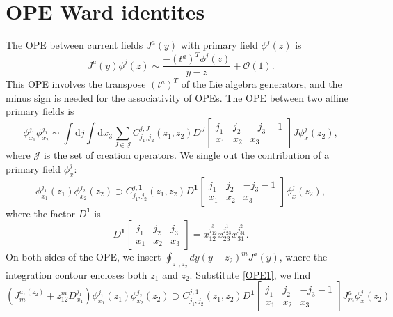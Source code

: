 \documentclass[10pt,a4paper]{article}
\theoremstyle{definition}
\theoremstyle{plain}
\theoremstyle{remark}
\numberwithin{equation}{section}
\begin{document}
\section{OPE Ward identites}
The OPE between current fields $J^{a}(y)$ with primary field $\phi^{j}(z)$ is 
\begin{equation}
        J^{a}(y) \phi^{j}(z) \sim \frac{-\left(t^{a}\right)^{T} \phi^{j}(z)}{y-z} + \mathcal{O}(1). \label{OPE1}
\end{equation}
This OPE involves the transpose $ \left(t^{a}\right)^{T} $ of the Lie algebra generators, and the minus sign is needed for the associativity of OPEs.
The OPE between two affine primary fields is 
\begin{equation}
    \phi^{j_{1}}_{x_{1}} \phi^{j_{1}}_{x_{2}} \sim \int \mathrm{d} j \int \mathrm{d} x_{3} \sum_{J \in \mathcal{J}} C^{j,J}_{j_{1},j_{2}}(z_{1},z_{2}) D^{J} \left[\begin{array}{ccc}
j_{1} & j_2 & -j_3-1 \\
x_1 & x_2 & x_3
\end{array} \right] J \phi^{j}_{x}(z_{2}),
\end{equation}
where $\mathcal{J}$ is the set of creation operators. We single out the contribution of a primary field $\phi^{j}_{x}$:
\begin{equation}
    \phi^{j_{1}}_{x_{1}} (z_{1}) \phi^{j_{2}}_{x_{2}} (z_{2}) \supset C^{j,\mathbf{1}}_{j_{1},j_{2}}(z_{1},z_{2}) D^{\mathbf{1}} \left[\begin{array}{ccc}
j_{1} & j_2 & -j_3-1 \\
x_1 & x_2 & x_3
\end{array} \right] \phi^{j}_{x}(z_{2}),
\end{equation}
where the factor $D^{\mathbf{1}}$ is
\begin{equation}
    D^{\mathbf{1}} \left[\begin{array}{ccc}
j_{1} & j_2 & j_3 \\
x_1 & x_2 & x_3
\end{array} \right] = x_{12}^{j_{12}^{3}} x_{23}^{j_{23}^{1}} x_{31}^{j_{31}^{2}}. \label{3px}
\end{equation}
On both sides of the OPE, we insert $\oint_{z_{1},z_{2}} dy \left(y-z_{2}\right)^{m} J^{a}(y)$, 
where the integration contour encloses both $z_{1}$ and $z_{2}$. Substitute \ref{OPE1}, we find 
\begin{equation}
    \left( J^{a,(z_{2})}_{m} + z_{12}^{m} D^{j_{1}}_{x_{1}} \right) \phi^{j_{1}}_{x_{1}} (z_{1}) \phi^{j_{2}}_{x_{2}} (z_{2}) 
    \supset C^{j,\mathrm{1}}_{j_{1},j_{2}}(z_{1},z_{2}) D^{\mathbf{1}} \left[\begin{array}{ccc}
j_{1} & j_2 & -j_3-1 \\
x_1 & x_2 & x_3
\end{array} \right] J^{a}_{m} \phi^{j}_{x}(z_{2}) \label{OPEWard}
\end{equation}
\end{document}
